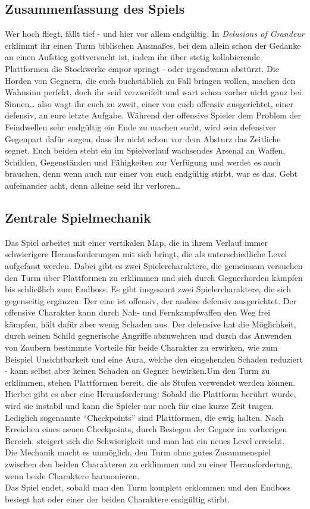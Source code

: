 \documentclass[11pt]{article}
\begin{document}
\subsection{Zusammenfassung des Spiels}
Wer hoch fliegt, fällt tief - und hier vor allem endgültig. In \textit{Delusions of Grandeur} erklimmt ihr einen Turm biblischen Ausmaßes, bei dem allein schon der Gedanke an einen Aufstieg gottversucht ist, indem ihr über stetig kollabierende Plattformen die Stockwerke empor springt - oder irgendwann abstürzt. Die Horden von Gegnern, die euch buchstäblich zu Fall bringen wollen, machen den Wahnsinn perfekt, doch ihr seid verzweifelt und wart schon vorher nicht ganz bei Sinnen… also wagt ihr euch zu zweit, einer von euch offensiv ausgerichtet, einer defensiv, an eure letzte Aufgabe. Während der offensive Spieler dem Problem der Feindwellen sehr endgültig ein Ende zu machen sucht, wird sein defensiver Gegenpart dafür sorgen, dass ihr nicht schon vor dem Absturz das Zeitliche segnet. Euch beiden steht ein im Spielverlauf wachsendes Arsenal an Waffen, Schilden, Gegenständen und Fähigkeiten zur Verfügung und werdet es auch brauchen, denn wenn auch nur einer von euch endgültig stirbt, war es das. Gebt aufeinander acht, denn alleine seid ihr verloren…

\subsection{Zentrale Spielmechanik}
Das Spiel arbeitet mit einer vertikalen Map, die in ihrem Verlauf immer schwierigere Herausforderungen mit sich bringt, die als unterschiedliche Level aufgefasst werden. Dabei gibt es zwei Spielercharaktere, die gemeinsam versuchen den Turm über Plattformen zu erklimmen und sich durch Gegnerhorden kämpfen bis schließlich zum Endboss. Es gibt insgesamt zwei Spielercharaktere, die sich gegenseitig ergänzen: Der eine ist offensiv, der andere defensiv ausgerichtet. Der offensive Charakter kann durch Nah- und Fernkampfwaffen den Weg frei kämpfen, hält dafür aber wenig Schaden aus. Der defensive hat die Möglichkeit, durch seinen Schild gegnerische Angriffe abzuwehren und durch das Anwenden von Zaubern bestimmte Vorteile für beide Charakter zu erwirken, wie zum Beispiel Unsichtbarkeit und eine Aura, welche den eingehenden Schaden reduziert - kann selbst aber keinen Schaden an Gegner bewirken.Um den Turm zu erklimmen, stehen Plattformen bereit, die als Stufen verwendet werden können. Hierbei gibt es aber eine Herausforderung: Sobald die Plattform berührt wurde, wird sie instabil und kann die Spieler nur noch für eine kurze Zeit tragen. Lediglich sogenannte “Checkpoints” sind Plattformen, die ewig halten. Nach Erreichen eines neuen Checkpoints, durch Besiegen der Gegner im vorherigen Bereich, steigert sich die Schwierigkeit und man hat ein neues Level erreicht.\\
Die Mechanik macht es unmöglich, den Turm ohne gutes Zusammenspiel zwischen den beiden Charakteren zu erklimmen und zu einer Herausforderung, wenn beide Charaktere harmonieren.\\
Das Spiel endet, sobald man den Turm komplett erklommen und den Endboss besiegt hat oder einer der beiden Charaktere endgültig stirbt.\\
\newpage
\end{document}
